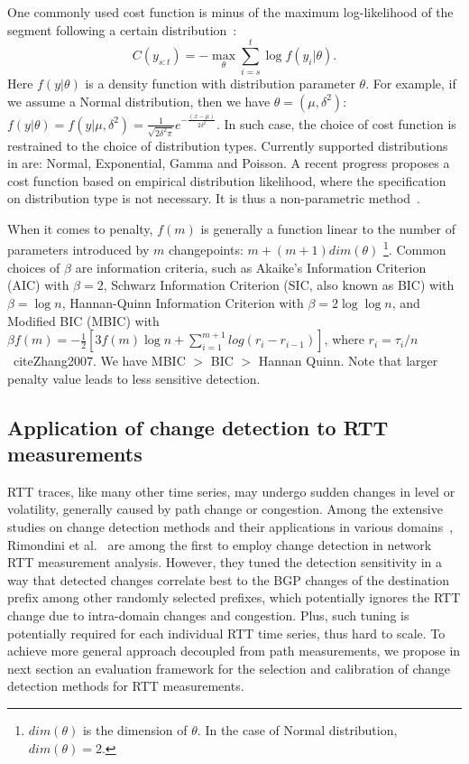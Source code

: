 One commonly used cost function is minus of the maximum log-likelihood of the segment following a certain distribution~\cite{Killick2011,Horvath1993,Chen2001}:
\begin{equation*}
C(y_{s:t}) = - \max_\theta \sum_{i=s}^t \log f(y_i|\theta).
\end{equation*}
Here $f(y|\theta)$ is a density function with distribution parameter $\theta$. 
For example, if we assume a Normal distribution, then we have $\theta = (\mu, \delta^2)$:
$f(y|\theta) = f(y|\mu, \delta^2) = \frac{1}{\sqrt{2\delta^2\pi}} e^{-\frac{(x-\mu)}{2\delta^2}}$.
In such case, the choice of cost function is restrained to the choice of distribution types.
Currently supported distributions in \cite{Killick2013a} are: Normal, Exponential, Gamma and Poisson.
A recent progress proposes a cost function based on empirical distribution likelihood, where the specification on distribution type is not necessary. It is thus a non-parametric method~\cite{Haynes2016}. 

When it comes to penalty, $f(m)$ is generally a function linear to the number of parameters introduced by $m$ changepoints: 
$m + (m+1)dim(\theta)$ \footnote{$dim(\theta)$ is the dimension of $\theta$. In the case of Normal distribution, $dim(\theta) = 2$.}.
Common choices of $\beta$ are information criteria, such as Akaike’s Information Criterion (AIC) with $\beta=2$, Schwarz Information Criterion (SIC, also known as BIC) with $\beta=\log n$, Hannan-Quinn Information Criterion with $\beta = 2 \log \log n$, and Modified BIC (MBIC) with 
$\beta f(m) = -\frac{1}{2} [3f(m)\log n + \sum_{i=1}^{m+1} log(r_i - r_{i-1})]$, where $r_i = \tau_i/n$~cite{Zhang2007}.
We have MBIC $>$ BIC $>$ Hannan Quinn. Note that larger penalty value leads to less sensitive detection.

\subsection{Application of change detection to RTT measurements}
RTT traces, like many other time series, may undergo sudden changes in level or volatility, generally caused by path change or congestion.
Among the extensive studies on change detection methods and their applications in various domains~\cite{Zhang2007,Reeves2007, Yu2008},
Rimondini et al.~\cite{Rimondini2014} are among the first to employ change detection in network RTT measurement analysis.
However, they tuned the detection sensitivity in a way that detected changes correlate best to the BGP changes of the destination prefix among other randomly selected prefixes, which potentially ignores the RTT change due to intra-domain changes and congestion.
Plus, such tuning is potentially required for each individual RTT time series, thus hard to scale.
To achieve more general approach decoupled from path measurements, we propose in next section an evaluation framework for the selection and calibration of change detection methods for RTT measurements.


